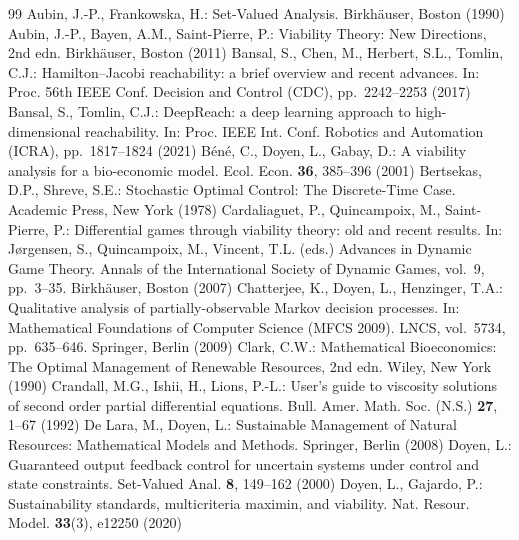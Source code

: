 \documentclass[11pt,a4paper]{article}
\theoremstyle{plain}
\theoremstyle{definition}
\theoremstyle{remark}
\begin{document}
\begin{thebibliography}{99}
 Aubin, J.-P., Frankowska, H.: Set-Valued Analysis. Birkh\"auser, Boston (1990)
 Aubin, J.-P., Bayen, A.M., Saint-Pierre, P.: Viability Theory: New Directions, 2nd edn. Birkh\"auser, Boston (2011)
 Bansal, S., Chen, M., Herbert, S.L., Tomlin, C.J.: Hamilton--Jacobi reachability: a brief overview and recent advances. In: Proc. 56th IEEE Conf. Decision and Control (CDC), pp.~2242--2253 (2017)
 Bansal, S., Tomlin, C.J.: DeepReach: a deep learning approach to high-dimensional reachability. In: Proc. IEEE Int. Conf. Robotics and Automation (ICRA), pp.~1817--1824 (2021)
 B\'en\'e, C., Doyen, L., Gabay, D.: A viability analysis for a bio-economic model. Ecol. Econ. \textbf{36}, 385--396 (2001)
 Bertsekas, D.P., Shreve, S.E.: Stochastic Optimal Control: The Discrete-Time Case. Academic Press, New York (1978)
 Cardaliaguet, P., Quincampoix, M., Saint-Pierre, P.: Differential games through viability theory: old and recent results. In: J{\o}rgensen, S., Quincampoix, M., Vincent, T.L. (eds.) Advances in Dynamic Game Theory. Annals of the International Society of Dynamic Games, vol.~9, pp.~3--35. Birkh\"auser, Boston (2007)
 Chatterjee, K., Doyen, L., Henzinger, T.A.: Qualitative analysis of partially-observable Markov decision processes. In: Mathematical Foundations of Computer Science (MFCS 2009). LNCS, vol.~5734, pp.~635--646. Springer, Berlin (2009)
 Clark, C.W.: Mathematical Bioeconomics: The Optimal Management of Renewable Resources, 2nd edn. Wiley, New York (1990)
 Crandall, M.G., Ishii, H., Lions, P.-L.: User's guide to viscosity solutions of second order partial differential equations. Bull. Amer. Math. Soc. (N.S.) \textbf{27}, 1--67 (1992)
 De Lara, M., Doyen, L.: Sustainable Management of Natural Resources: Mathematical Models and Methods. Springer, Berlin (2008)
 Doyen, L.: Guaranteed output feedback control for uncertain systems under control and state constraints. Set-Valued Anal. \textbf{8}, 149--162 (2000)
 Doyen, L., Gajardo, P.: Sustainability standards, multicriteria maximin, and viability. Nat. Resour. Model. \textbf{33}(3), e12250 (2020)

\end{thebibliography}
\end{document}
